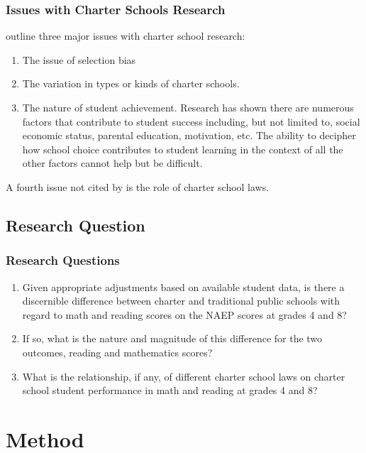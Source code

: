 \documentclass[10pt,handout,mathserif]{beamer}
\begin{document}
\begin{frame}[c]
	\frametitle{Issues with Charter Schools Research}
	 outline three major issues with charter school research:\vspace{15pt}
	\begin{enumerate}[<+-| alert@+>]
	    \setlength{\itemsep}{15pt}
		\item The issue of selection bias
		\item The variation in types or kinds of charter schools.
		\item The nature of student achievement. Research has shown there are numerous factors that contribute to student success including, but not limited to, social economic status, parental education, motivation, etc. The ability to decipher how school choice contributes to student learning in the context of all the other factors cannot help but be difficult.
	\end{enumerate}
    \vspace{15pt}
	\pause
	A fourth issue not cited by  is the role of charter school laws.
\end{frame}

\subsection{Research Question}

\begin{frame}[c]
	\frametitle{Research Questions}
	\begin{enumerate}[<+-| alert@+>]
    \setlength{\itemsep}{15pt}
	\item Given appropriate adjustments based on available student data, is there a discernible difference between charter and traditional public schools with regard to math and reading scores on the NAEP scores at grades 4 and 8?
    \item If so, what is the nature and magnitude of this difference for the two outcomes, reading and mathematics scores?
    \item What is the relationship, if any, of different charter school laws on charter school student performance in math and reading at grades 4 and 8?
	\end{enumerate}
\end{frame}

\section{Method}
\end{document}

